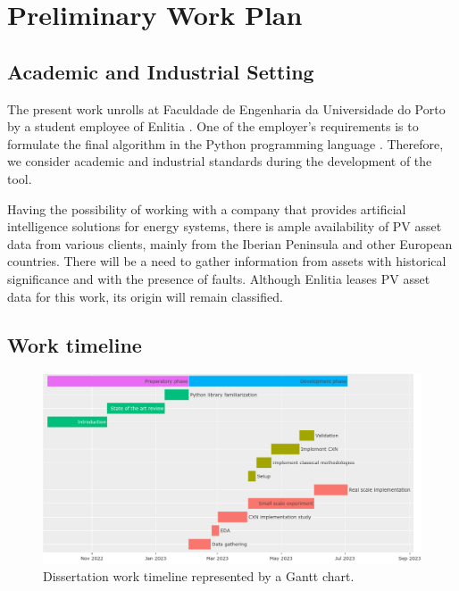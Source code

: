 \chapter{Preliminary Work Plan} \label{chap:chap3}

\section{Academic and Industrial Setting}

The present work unrolls at Faculdade de Engenharia da Universidade do Porto by a student employee of Enlitia \cite{EL}. One of the employer's requirements is to formulate the final algorithm in the Python programming language \cite{Python}. Therefore, we consider academic and industrial standards during the development of the tool.

Having the possibility of working with a company that provides artificial intelligence solutions for energy systems, there is ample availability of PV asset data from various clients, mainly from the Iberian Peninsula and other European countries. There will be a need to gather information from assets with historical significance and with the presence of faults. Although Enlitia leases PV asset data for this work, its origin will remain classified.

\section{Work timeline}

\begin{figure}[h!]
    \centering
    \includegraphics[width=\linewidth]{figures/chapter3/gantt.png} \caption{Dissertation work timeline represented by a Gantt chart.}
    \label{fig:gantt}
\end{figure}

